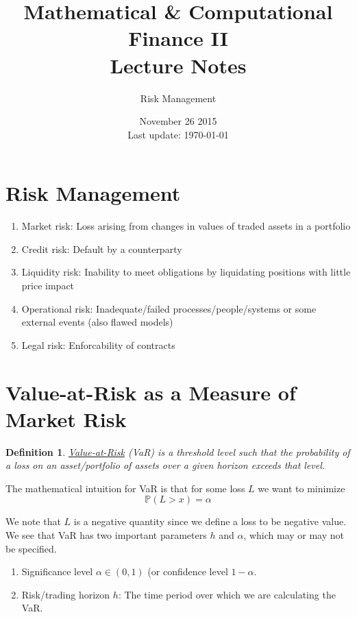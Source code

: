 \documentclass[12pt]{article}
\newtheorem{definition}{Definition}
\newlength\tindent
\renewcommand{\indent}{\hspace*{\tindent}}
\renewcommand{\P}{\mathbb P}
\begin{document}
 
 
\title{Mathematical \& Computational Finance II\\Lecture Notes}
\author{Risk Management}
\date{November 26 2015 \\ Last update: \today{}}
\maketitle

\section{Risk Management}
\begin{enumerate}
	\item Market risk: Loss arising from changes in values of traded assets in a portfolio
	\item Credit risk: Default by a counterparty
	\item Liquidity risk: Inability to meet obligations by liquidating positions with little price impact
	\item Operational risk: Inadequate/failed processes/people/systems or some external events (also flawed models) 
	\item Legal risk: Enforcability of contracts
\end{enumerate}

\section{Value-at-Risk as a Measure of Market Risk}

\begin{definition} \underline{Value-at-Risk} (VaR) is a threshold level such that the probability of a loss on an asset/portfolio of assets over a given horizon exceeds that level.
\end{definition}

The mathematical intuition for VaR is that for some loss $L$ we want to minimize
\begin{equation*}
	\P( L > x ) = \alpha
\end{equation*}

\indent We note that $L$ is a negative quantity since we define a loss to be negative value. We see that VaR has two important parameters $h$ and $\alpha$, which may or may not be specified.
\begin{enumerate}
	\item Significance level $\alpha \in (0, 1)$ (or confidence level $1 - \alpha$.
	\item Risk/trading horizon $h$: The time period over which we are calculating the VaR.
\end{enumerate}
\end{document}
